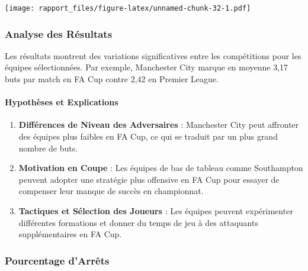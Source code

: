 \documentclass[
]{article}
\providecommand{\tightlist}{%
  \setlength{\itemsep}{0pt}\setlength{\parskip}{0pt}}
\begin{document}
\texttt{[image: rapport\_files/figure-latex/unnamed-chunk-32-1.pdf]}

\subsubsection{Analyse des Résultats}\label{analyse-des-ruxe9sultats-3}

Les résultats montrent des variations significatives entre les
compétitions pour les équipes sélectionnées. Par exemple, Manchester
City marque en moyenne 3,17 buts par match en FA Cup contre 2,42 en
Premier League.

\paragraph{Hypothèses et
Explications}\label{hypothuxe8ses-et-explications-2}

\begin{enumerate}
\def\labelenumi{\arabic{enumi}.}
\tightlist
\item
  \textbf{Différences de Niveau des Adversaires} : Manchester City peut
  affronter des équipes plus faibles en FA Cup, ce qui se traduit par un
  plus grand nombre de buts.
\item
  \textbf{Motivation en Coupe} : Les équipes de bas de tableau comme
  Southampton peuvent adopter une stratégie plus offensive en FA Cup
  pour essayer de compenser leur manque de succès en championnat.
\item
  \textbf{Tactiques et Sélection des Joueurs} : Les équipes peuvent
  expérimenter différentes formations et donner du temps de jeu à des
  attaquants supplémentaires en FA Cup.
\end{enumerate}

\subsubsection{Pourcentage d'Arrêts}\label{pourcentage-darruxeats-1}
\end{document}

